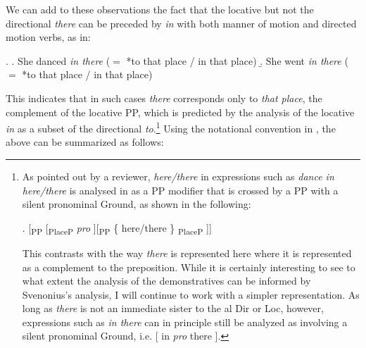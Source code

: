\vskip 1cm
 
 
\noindent
We can add to these observations the fact that the locative but not the directional \textit{there} can be preceded by \textit{in} with both manner of motion and directed motion verbs, as in:

\ex. 
\a. She danced \textit{in there} ($=$ *to that place / in that place)
\b. She went \textit{in there} ($=$ *to that place / in that place)

This indicates that in such cases \textit{there} corresponds only to \textit{that place}, the complement of the locative PP, which is predicted by the analysis of the locative  \textit{in} as a subset of the directional \textit{to}.\footnote{As pointed out by a reviewer, \textit{here/there} in expressions such as \textit{dance in here/there} is analysed in \cite{Svenonius2010} as a PP modifier that is crossed by a PP with a silent pronominal Ground, as shown in the following:

\ex.
\setlength{\arrowht}{3ex}
\newcommand*\cgdepthstrut{{\vrule height 0pt depth \arrowht width 0pt}}
\renewcommand\eachwordone{\cgdepthstrut\rmfamily}
\renewcommand\glt{\vskip -\topsep}
\let\trans=\glt
\newcommand\arrowex{\setlength{\arrowht}{1ex}\ex}
[\textsubscript{PP} [\textsubscript{PlaceP}  \textit{pro} ][\textsubscript{PP} \{ here/there \}  \textsubscript{PlaceP}  ]]

\vspace{0.25cm}
This contrasts with the way \textit{there} is represented here where it is represented as a complement to the preposition. While it is certainly interesting to see to what extent the analysis of the  demonstratives can be informed by Svenonius's analysis, I will continue to work with a simpler representation. As long as \textit{there} is not an immediate sister to the al Dir or Loc, however, expressions such as \textit{in there} can in principle still be analyzed as involving a silent pronominal Ground, i.e. [ in \textit{pro} there ].
} %
Using the notational convention in \cite{GVW-Olinco}, the above can be summarized as follows:
 
